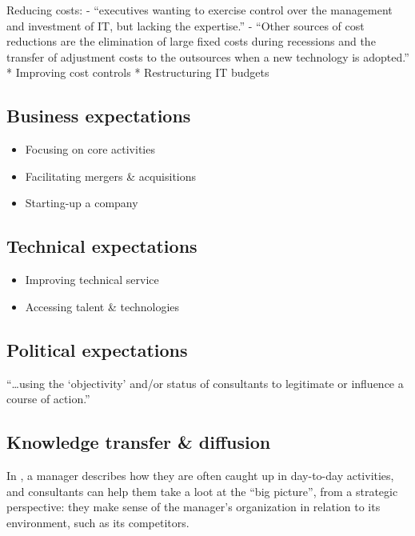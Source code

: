 \documentclass[12pt]{article}
\providecommand{\tightlist}{%
  \setlength{\itemsep}{0pt}\setlength{\parskip}{0pt}}
\begin{document}
Reducing costs: - ``executives wanting to exercise control over the
management and investment of IT, but lacking the expertise.'' \citep[
233]{sturdy1998} - ``Other sources of cost reductions are the
elimination of large fixed costs during recessions and the transfer of
adjustment costs to the outsources when a new technology is adopted.''
\citep{aubert1996} * Improving cost controls * Restructuring IT budgets

\hypertarget{business-expectations}{%
\subsection{Business expectations}\label{business-expectations}}

\begin{itemize}
\tightlist
\item
  Focusing on core activities
\item
  Facilitating mergers \& acquisitions
\item
  Starting-up a company
\end{itemize}

\hypertarget{technical-expectations}{%
\subsection{Technical expectations}\label{technical-expectations}}

\begin{itemize}
\tightlist
\item
  Improving technical service
\item
  Accessing talent \& technologies
\end{itemize}

\hypertarget{political-expectations}{%
\subsection{Political expectations}\label{political-expectations}}

``\ldots using the `objectivity' and/or status of consultants to
legitimate or influence a course of action.'' \citep[ 233]{sturdy1998}

\hypertarget{knowledge-transfer-diffusion}{%
\subsection{Knowledge transfer \&
diffusion}\label{knowledge-transfer-diffusion}}

In \citet[53]{werr2002}, a manager describes how they are often caught
up in day-to-day activities, and consultants can help them take a loot
at the ``big picture'', from a strategic perspective: they make sense of
the manager's organization in relation to its environment, such as its
competitors.
\end{document}
